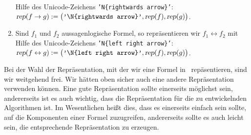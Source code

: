 \begin{enumerate}
      Hilfe des Unicode-Zeichens  \texttt{'N\{rightwards arrow\}'}:
      \\[0.2cm]
      \hspace*{1.3cm} 
      $\textsl{rep}(f \rightarrow g) := \bigl(\texttt{'\symbol{92}N\{rightwards arrow\}'}, \textsl{rep}(f), \textsl{rep}(g)\bigr)$.
\item Sind $f_1$ und $f_2$ aussagenlogische Formel, so repräsentieren wir $f_1 \leftrightarrow f_2$ mit
      Hilfe des Unicode-Zeichens  \texttt{'N\{left right arrow\}'}:
      \\[0.2cm]
      \hspace*{1.3cm} 
      $\textsl{rep}(f \leftrightarrow g) := \bigl(\texttt{'\symbol{92}N\{left right arrow\}'}, \textsl{rep}(f), \textsl{rep}(g)\bigr)$.
\end{enumerate}
Bei der Wahl der Repräsentation, mit der wir eine Formel in \setl\ repäsentieren,
sind wir weitgehend frei.  Wir hätten oben sicher auch eine andere Repräsentation
verwenden können.  Eine gute Repräsentation sollte einerseits möglichst  sein, andererseits ist
es auch wichtig, dass die Repräsentation für die zu entwickelnden Algorithmen 
ist.  Im Wesentlichen heißt dies, dass es einerseits einfach sein sollte, auf
die Komponenten einer Formel zuzugreifen, andererseits sollte es auch leicht sein,
die entsprechende Repräsentation zu erzeugen.

